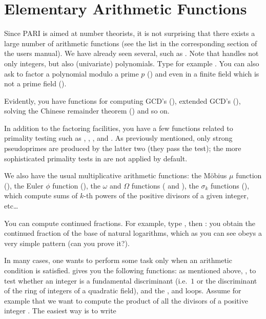 \section{Elementary Arithmetic Functions}

Since PARI is aimed at number theorists, it is not surprising that there
exists a large number of arithmetic functions (see the list in the
corresponding section of the users manual). We have already seen several,
such as . Note that  handles not only integers, but
also (univariate) polynomials. Type for example .
You can also ask to factor a polynomial modulo a prime $p$ ()
and even in a finite field which is not a prime field ().

Evidently, you have functions for computing GCD's (), extended GCD's
(), solving the Chinese remainder theorem () and so
on.

In addition to the factoring facilities, you have a few functions related to
primality testing such as , ,
, and . As previously mentioned, only strong
pseudoprimes are produced by the latter two (they pass the
 test); the more sophisticated primality tests in
 are not applied by default.

We also have the usual multiplicative arithmetic functions: the M\"obius $\mu$
function (), the Euler $\phi$ function (), the
$\omega$ and $\Omega$ functions ( and ), the
$\sigma_k$ functions (), which compute sums of $k$-th powers of the
positive divisors of a given integer, etc\dots

You can compute continued fractions. For example, type , then
: you obtain the continued fraction of the base of
natural logarithms, which as you can see obeys a very simple pattern (can you
prove it?).

In many cases, one wants to perform some task only when an arithmetic
condition is satisfied.  gives you the following functions: 
as mentioned above, ,  to test whether an
integer is a fundamental discriminant (i.e.~$1$ or the discriminant of the
ring of integers of a quadratic field), and the , 
and  loops. Assume for example that we want to compute the
product of all the divisors of a positive integer . The easiest way is
to write

